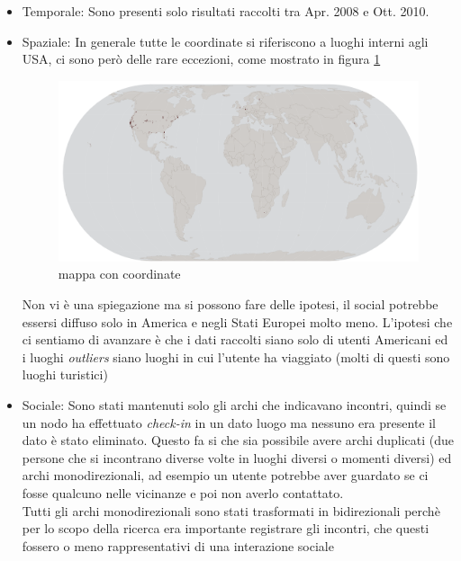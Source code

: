 \documentclass[a4paper]{article}
\begin{document}
\begin{itemize}
	\item Temporale: Sono presenti solo risultati raccolti tra Apr. 2008 e Ott. 2010.
	\item Spaziale: In generale tutte le coordinate si riferiscono a luoghi interni agli USA, ci sono però delle rare eccezioni, come mostrato in figura \ref{FIG:posizione_generica}
		\begin{figure}[!ht]
			\centering
			\includegraphics[width=\linewidth]{posizione_generica}
			\caption{mappa con coordinate}
			\label{FIG:posizione_generica}
		\end{figure}
		Non vi è una spiegazione ma si possono fare delle ipotesi, il social potrebbe essersi diffuso solo in America e negli Stati Europei molto meno.
		L'ipotesi che ci sentiamo di avanzare è che i dati raccolti siano solo di utenti Americani ed i luoghi \textit{outliers} siano luoghi in cui l'utente ha viaggiato (molti di questi sono luoghi turistici)
	\item Sociale: Sono stati mantenuti solo gli archi che indicavano incontri, quindi se un nodo ha effettuato \textit{check-in} in un dato luogo ma nessuno era presente il dato è stato eliminato.
		Questo fa si che sia possibile avere archi duplicati (due persone che si incontrano diverse volte in luoghi diversi o momenti diversi) ed archi monodirezionali, ad esempio un utente potrebbe aver guardato se ci fosse qualcuno nelle vicinanze e poi non averlo contattato.\\
		Tutti gli archi monodirezionali sono stati trasformati in bidirezionali perchè per lo scopo della ricerca era importante registrare gli incontri, che questi fossero o meno rappresentativi di una interazione sociale
\end{itemize}
\end{document}
